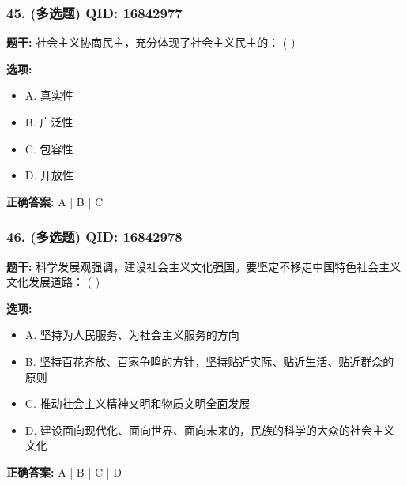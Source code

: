 \documentclass[12pt,UTF8]{ctexart}
\begin{document}
\subsubsection*{45. (多选题) \small QID: 16842977}

\textbf{题干:}
社会主义协商民主，充分体现了社会主义民主的： ( )

\textbf{选项:}
\begin{itemize}[leftmargin=*]

  \item A. 真实性

  \item B. 广泛性

  \item C. 包容性

  \item D. 开放性

\end{itemize}

\textbf{正确答案:}
A | B | C

\vspace{0.3em}\hrulefill\vspace{0.7em}

\subsubsection*{46. (多选题) \small QID: 16842978}

\textbf{题干:}
科学发展观强调，建设社会主义文化强国。要坚定不移走中国特色社会主义文化发展道路： ( )

\textbf{选项:}
\begin{itemize}[leftmargin=*]

  \item A. 坚持为人民服务、为社会主义服务的方向

  \item B. 坚持百花齐放、百家争鸣的方针，坚持贴近实际、贴近生活、贴近群众的原则

  \item C. 推动社会主义精神文明和物质文明全面发展

  \item D. 建设面向现代化、面向世界、面向未来的，民族的科学的大众的社会主义文化

\end{itemize}

\textbf{正确答案:}
A | B | C | D

\vspace{0.3em}\hrulefill\vspace{0.7em}
\end{document}

